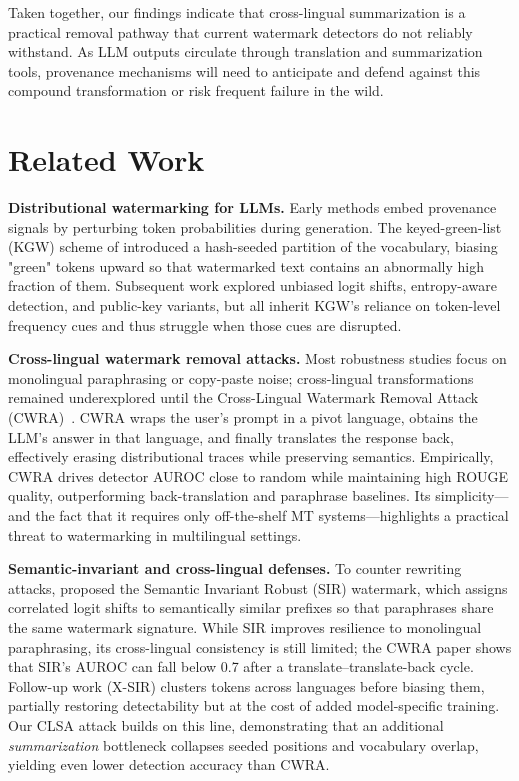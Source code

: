 \documentclass{article}
\begin{document}
Taken together, our findings indicate that cross-lingual summarization is a practical removal pathway that current watermark detectors do not reliably withstand. As LLM outputs circulate through translation and summarization tools, provenance mechanisms will need to anticipate and defend against this compound transformation or risk frequent failure in the wild.

\section{Related Work}

\textbf{Distributional watermarking for LLMs.}
Early methods embed provenance signals by perturbing token probabilities during generation.
The keyed-green-list (KGW) scheme of \citet{kirchenbauer2023watermark} introduced a hash-seeded partition of the vocabulary, biasing "green" tokens upward so that watermarked text contains an abnormally high fraction of them.
Subsequent work explored unbiased logit shifts, entropy-aware detection, and public-key variants, but all inherit KGW's reliance on token-level frequency cues and thus struggle when those cues are disrupted.

\textbf{Cross-lingual watermark removal attacks.}
Most robustness studies focus on monolingual paraphrasing or copy-paste noise; cross-lingual transformations remained underexplored until the Cross-Lingual Watermark Removal Attack (CWRA)~\citep{He2024cwra}.
CWRA wraps the user's prompt in a pivot language, obtains the LLM's answer in that language, and finally translates the response back, effectively erasing distributional traces while preserving semantics.
Empirically, CWRA drives detector AUROC close to random while maintaining high ROUGE quality, outperforming back-translation and paraphrase baselines.
Its simplicity—and the fact that it requires only off-the-shelf MT systems—highlights a practical threat to watermarking in multilingual settings.

\textbf{Semantic-invariant and cross-lingual defenses.}
To counter rewriting attacks, \citet{liu2024sir} proposed the Semantic Invariant Robust (SIR) watermark, which assigns correlated logit shifts to semantically similar prefixes so that paraphrases share the same watermark signature.
While SIR improves resilience to monolingual paraphrasing, its cross-lingual consistency is still limited; the CWRA paper shows that SIR's AUROC can fall below 0.7 after a translate–translate-back cycle.
Follow-up work (X-SIR) clusters tokens across languages before biasing them, partially restoring detectability but at the cost of added model-specific training.
Our CLSA attack builds on this line, demonstrating that an additional \emph{summarization} bottleneck collapses seeded positions and vocabulary overlap, yielding even lower detection accuracy than CWRA.
\end{document}
